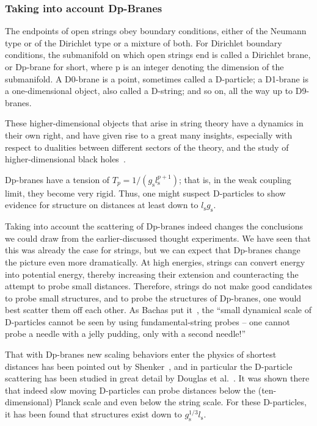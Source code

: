 \documentclass{article}
\begin{document}
\subsubsection{Taking into account Dp-Branes}
\label{branes}

The endpoints of open strings obey boundary conditions, either of the Neumann type or of the Dirichlet type or a mixture of both. For Dirichlet boundary conditions, the submanifold on which open strings end is called a Dirichlet brane, or Dp-brane for short, where p is an integer denoting the dimension
of the submanifold. A D0-brane is a point, sometimes called a D-particle; a D1-brane is a one-dimensional object, also called a D-string; and
so on, all the way up to D9-branes. 

These higher-dimensional objects that arise in
string theory have a dynamics in their own right, and have
given rise to a great many insights, especially with respect to dualities between different sectors of the theory, and the study of higher-dimensional black holes~\cite{Johnson:2000ch,Bachas:1998rg}.

Dp-branes have a tension of 
$T_{p} = 1/(g_{\mathrm{s}} l_{\mathrm{s}}^{p+1})$; that is, in the weak coupling limit, they become very rigid. Thus, one might suspect D-particles to show evidence for structure on distances at least down to $l_{\mathrm{s}}g_{\mathrm{s}}$.

Taking into account the scattering of Dp-branes indeed changes the conclusions we
could draw from the earlier-discussed thought experiments. We have seen that this was already the case for strings, but we 
can expect that Dp-branes change the picture even more dramatically. At high energies, strings can convert energy into potential energy,
thereby increasing their extension and counteracting the attempt to probe small distances. Therefore, strings do not make
good candidates to probe small structures, and to probe the structures of Dp-branes, one would best scatter them off
each other. As Bachas put it~\cite{Bachas:1998rg}, the ``small dynamical scale of D-particles cannot be seen by using fundamental-string probes -- one cannot probe a
needle with a jelly pudding, only with a second needle!'' 

That with Dp-branes new scaling behaviors enter the physics of shortest distances has been pointed out by
Shenker~\cite{Shenker:1995xq}, and in particular the D-particle scattering has been studied in great detail by
Douglas et al.~\cite{Douglas:1996yp}. It was shown there
that indeed slow moving D-particles can probe distances below the (ten-dimensional) Planck scale and even below the string 
scale. For these D-particles, it has been found that structures exist down to $g_{\mathrm{s}}^{1/3}l_{\mathrm{s}}$.
\end{document}
